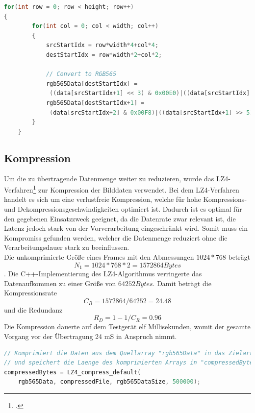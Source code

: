 \begin{lstlisting}[caption=Umwandlung des Pixelformates, label=lst:rgb_conversion, language=C++]
for(int row = 0; row < height; row++)
{
        for(int col = 0; col < width; col++)
        {
            srcStartIdx = row*width*4+col*4;
            destStartIdx = row*width*2+col*2;

            // Convert to RGB565
            rgb565Data[destStartIdx] =
             ((data[srcStartIdx+1] << 3) & 0x00E0)|((data[srcStartIdx] >> 3) & 0x001F);
            rgb565Data[destStartIdx+1] = 
             (data[srcStartIdx+2] & 0x00F8)|((data[srcStartIdx+1] >> 5) & 0x0007);
        }
    }
\end{lstlisting}

\subsection{Kompression}
Um die zu übertragende Datenmenge weiter zu reduzieren, wurde das LZ4-Verfahren\footcite{LZ4} zur Kompression der Bilddaten verwendet. Bei dem LZ4-Verfahren handelt es sich um eine verlustfreie Kompression, welche für hohe Kompressions- und Dekompressionsgeschwindigkeiten optimiert ist. Dadurch ist es optimal für den gegebenen Einsatzzweck geeignet, da die Datenrate zwar relevant ist, die Latenz jedoch stark von der Vorverarbeitung eingeschränkt wird. Somit muss ein Kompromiss gefunden werden, welcher die Datenmenge reduziert ohne die Verarbeitungsdauer stark zu beeinflussen. \\
Die unkomprimierte Größe eines Frames mit den Abmessungen $1024*768$ beträgt
\begin{equation}
N_1=1024*768*2=1572864 Bytes
\end{equation}.
Die C++-Implementierung des LZ4-Algorithmus verringerte das Datenaufkommen zu einer Größe von $64252 Bytes$. Damit beträgt die Kompressionsrate 
\begin{equation}
C_R=1572864/64252=24.48
\end{equation}
und die Redundanz
\begin{equation}
R_D=1-1/C_R=0.96
\end{equation}
Die Kompression dauerte auf dem Testgerät elf Millisekunden, womit der gesamte Vorgang vor der Übertragung 24 mS in Anspruch nimmt.

\begin{lstlisting}[caption=Kompression der Rohdaten, label=lst:compression, language=C++]
// Komprimiert die Daten aus dem Quellarray "rgb565Data" in das Zielarray "compressedFile"
// und speichert die Laenge des komprimierten Arrays in "compressedBytes"
compressedBytes = LZ4_compress_default(
	rgb565Data, compressedFile, rgb565DataSize, 500000);
\end{lstlisting}

